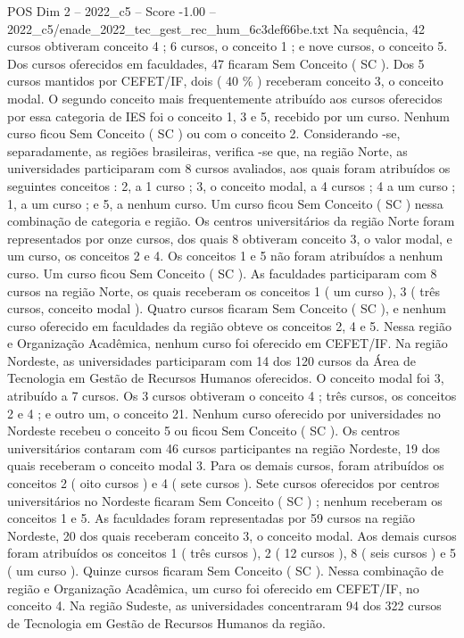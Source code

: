 \begin{textsample}{POS Dim 2 – 2022\_c5 – Score -1.00 – 2022\_c5/enade\_2022\_tec\_gest\_rec\_hum\_6c3def66be.txt}
Na sequência, 42 cursos obtiveram conceito 4 ; 6 cursos, o conceito 1 ; e nove cursos, o conceito 5.
Dos cursos oferecidos em faculdades, 47 ficaram Sem Conceito ( SC ).
Dos 5 cursos mantidos por CEFET/IF, dois ( 40 \% ) receberam conceito 3, o conceito modal.
O segundo conceito mais frequentemente atribuído aos cursos oferecidos por essa categoria de IES foi o conceito 1, 3 e 5, recebido por um curso.
Nenhum curso ficou Sem Conceito ( SC ) ou com o conceito 2.
Considerando -se, separadamente, as regiões brasileiras, verifica -se que, na região Norte, as universidades participaram com 8 cursos avaliados, aos quais foram atribuídos os seguintes conceitos : 2, a 1 curso ; 3, o conceito modal, a 4 cursos ; 4 a um curso ; 1, a um curso ; e 5, a nenhum curso.
Um curso ficou Sem Conceito ( SC ) nessa combinação de categoria e região.
Os centros universitários da região Norte foram representados por onze cursos, dos quais 8 obtiveram conceito 3, o valor modal, e um curso, os conceitos 2 e 4.
Os conceitos 1 e 5 não foram atribuídos a nenhum curso.
Um curso ficou Sem Conceito ( SC ).
As faculdades participaram com 8 cursos na região Norte, os quais receberam os conceitos 1 ( um curso ), 3 ( três cursos, conceito modal ).
Quatro cursos ficaram Sem Conceito ( SC ), e nenhum curso oferecido em faculdades da região obteve os conceitos 2, 4 e 5.
Nessa região e Organização Acadêmica, nenhum curso foi oferecido em CEFET/IF.
Na região Nordeste, as universidades participaram com 14 dos 120 cursos da Área de Tecnologia em Gestão de Recursos Humanos oferecidos.
O conceito modal foi 3, atribuído a 7 cursos.
Os 3 cursos obtiveram o conceito 4 ; três cursos, os conceitos 2 e 4 ; e outro um, o conceito 21.
Nenhum curso oferecido por universidades no Nordeste recebeu o conceito 5 ou ficou Sem Conceito ( SC ).
Os centros universitários contaram com 46 cursos participantes na região Nordeste, 19 dos quais receberam o conceito modal 3.
Para os demais cursos, foram atribuídos os conceitos 2 ( oito cursos ) e 4 ( sete cursos ).
Sete cursos oferecidos por centros universitários no Nordeste ficaram Sem Conceito ( SC ) ; nenhum receberam os conceitos 1 e 5.
As faculdades foram representadas por 59 cursos na região Nordeste, 20 dos quais receberam conceito 3, o conceito modal.
Aos demais cursos foram atribuídos os conceitos 1 ( três cursos ), 2 ( 12 cursos ), 8 ( seis cursos ) e 5 ( um curso ).
Quinze cursos ficaram Sem Conceito ( SC ).
Nessa combinação de região e Organização Acadêmica, um curso foi oferecido em CEFET/IF, no conceito 4.
Na região Sudeste, as universidades concentraram 94 dos 322 cursos de Tecnologia em Gestão de Recursos Humanos da região.

\end{textsample}
